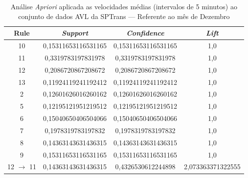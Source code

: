 \documentclass[
	12pt,				%
	oneside,			%
	a4paper,			%
	english,			%
	brazil				%
	]{abntex2ppgsi}
\begin{document}
{{\begin{apendicesenv}
\begin{table}[!htb]
\centering
\caption {Análise \textit{Apriori} aplicada as velocidades médias (intervalos de 5 minutos) ao conjunto de dados AVL da SPTrans --- Referente ao mês de Dezembro}
\label {tab:aprioriDecember}
\begin{tabular}{c|c|c|c}
\hline
\textbf{Rule} & \textit{\textbf{Support}} & \textit{\textbf{Confidence}} & \textit{\textbf{Lift}} \\
\hline
10 &  0,15311653116531165 &  0,15311653116531165 &  1,0\\
\hline
11 &  0,3319783197831978 &  0,3319783197831978 &  1,0\\
\hline
12 &  0,2086720867208672 &  0,2086720867208672 &  1,0\\
\hline
13 &  0,11924119241192412 &  0,11924119241192412 &  1,0\\
\hline
2 &  0,12601626016260162 &  0,12601626016260162 &  1,0\\
\hline
5 &  0,12195121951219512 &  0,12195121951219512 &  1,0\\
\hline
6 &  0,15040650406504066 &  0,15040650406504066 &  1,0\\
\hline
7 &  0,1978319783197832 &  0,1978319783197832 &  1,0\\
\hline
8 &  0,14363143631436315 &  0,14363143631436315 &  1,0\\
\hline
9 &  0,15311653116531165 &  0,15311653116531165 &  1,0\\
\hline
12 $\rightarrow$ 11 &  0,14363143631436315 &  0,4326530612244898 &  2,073363371322555\\
\hline
\end{tabular}
\end{table}


\end{apendicesenv}}}
\end{document}
